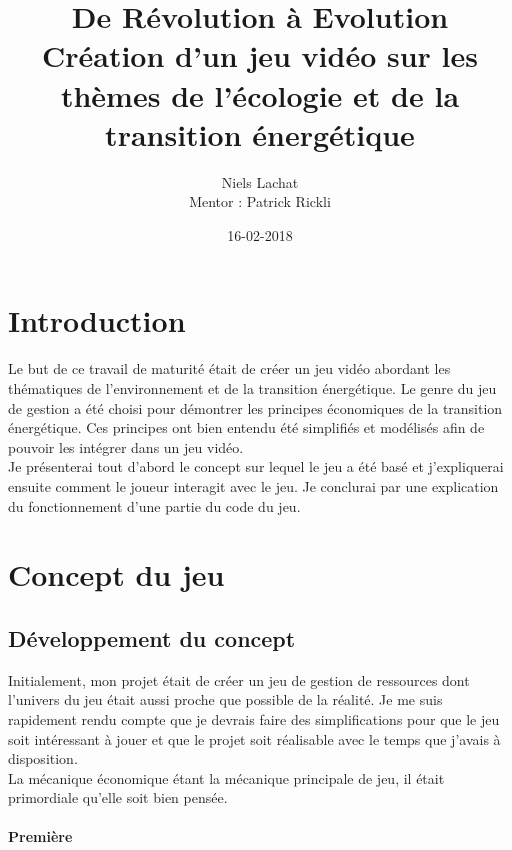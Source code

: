 \documentclass{article}
\title{De Révolution à Evolution \\ Création d'un jeu vidéo sur les thèmes de l'écologie et de la transition énergétique}
\date{16-02-2018}
\author{Niels Lachat \\ Mentor : Patrick Rickli}
\begin{document}
        \maketitle
        \newpage

        \tableofcontents
        \newpage

        \section{Introduction}
        Le but de ce travail de maturité était de créer un jeu vidéo abordant les thématiques de l'environnement et de la transition énergétique. 
        Le genre du jeu de gestion a été choisi pour démontrer les principes économiques de la transition énergétique.
        Ces principes ont bien entendu été simplifiés et modélisés afin de pouvoir les intégrer dans un jeu vidéo.
        \\
        Je présenterai tout d'abord le concept sur lequel le jeu a été basé et j'expliquerai ensuite comment le joueur interagit avec le jeu.
        Je conclurai par une explication du fonctionnement d'une partie du code du jeu.

        \section{Concept du jeu}
        \subsection{Développement du concept}
        
        Initialement, mon projet était de créer un jeu de gestion de ressources dont l'univers du jeu était aussi proche que possible de la réalité. Je me suis rapidement rendu compte que je devrais faire des simplifications pour que le jeu soit intéressant à jouer et que le projet soit réalisable avec le temps que j'avais à disposition. \\
        La mécanique économique étant la mécanique principale de jeu, il était primordiale qu'elle soit bien pensée.
        
        \paragraph{Première } \hspace{0pt} \\
        
\end{document}
